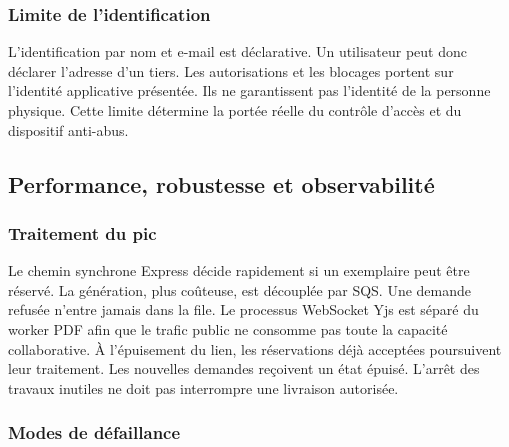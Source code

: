 \subsubsection{Limite de l'identification}

L'identification par nom et e-mail est déclarative. Un utilisateur peut donc déclarer l'adresse d'un tiers. Les autorisations et les blocages portent sur l'identité applicative présentée. Ils ne garantissent pas l'identité de la personne physique. Cette limite détermine la portée réelle du contrôle d'accès et du dispositif anti-abus.


\subsection{Performance, robustesse et observabilité}
\subsubsection{Traitement du pic}


Le chemin synchrone Express décide rapidement si un exemplaire peut être réservé. La génération, plus coûteuse, est découplée par SQS. Une demande refusée n'entre jamais dans la file. Le processus WebSocket Yjs est séparé du worker PDF afin que le trafic public ne consomme pas toute la capacité collaborative. À l'épuisement du lien, les réservations déjà acceptées poursuivent leur traitement. Les nouvelles demandes reçoivent un état épuisé. L'arrêt des travaux inutiles ne doit pas interrompre une livraison autorisée.


\subsubsection{Modes de défaillance}

